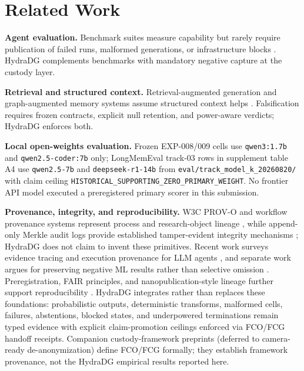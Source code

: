\documentclass{article}
\begin{document}
\section{Related Work}

\textbf{Agent evaluation.} Benchmark suites measure capability but rarely require publication of failed runs, malformed generations, or infrastructure blocks \cite{liu2023agentbench,zhou2023webarena}.
HydraDG complements benchmarks with mandatory negative capture at the custody layer.

\textbf{Retrieval and structured context.} Retrieval-augmented generation and graph-augmented memory systems assume structured context helps \cite{lewis2020rag,edge2024graphrag}.
Falsification requires frozen contracts, explicit null retention, and power-aware verdicts; HydraDG enforces both.

\textbf{Local open-weights evaluation.} Frozen EXP-008/009 cells use \texttt{qwen3:1.7b} and \texttt{qwen2.5-coder:7b} only; LongMemEval track-03 rows in supplement table A4 use \texttt{qwen2.5-7b} and \texttt{deepseek-r1-14b} from \texttt{eval/track\_model\_k\_20260820/} with claim ceiling \texttt{HISTORICAL\_SUPPORTING\_ZERO\_PRIMARY\_WEIGHT}.
No frontier API model executed a preregistered primary scorer in this submission.

\textbf{Provenance, integrity, and reproducibility.}
W3C PROV-O and workflow provenance systems represent process and research-object lineage \cite{lebo2013provo,khan2019cwlprov}, while append-only Merkle audit logs provide established tamper-evident integrity mechanisms \cite{laurie2013ct}; HydraDG does not claim to invent these primitives.
Recent work surveys evidence tracing and execution provenance for LLM agents \cite{wang2026agentprovenance}, and separate work argues for preserving negative ML results rather than selective omission \cite{karl2024negative}.
Preregistration, FAIR principles, and nanopublication-style lineage further support reproducibility \cite{nosek2018prereg,wilkinson2016fair,groth2010nano}.
HydraDG integrates rather than replaces these foundations: probabilistic outputs, deterministic transforms, malformed cells, failures, abstentions, blocked states, and underpowered terminations remain typed evidence with explicit claim-promotion ceilings enforced via FCO/FCG handoff receipts.
Companion custody-framework preprints (deferred to camera-ready de-anonymization) define FCO/FCG formally; they establish framework provenance, not the HydraDG empirical results reported here.
\end{document}
